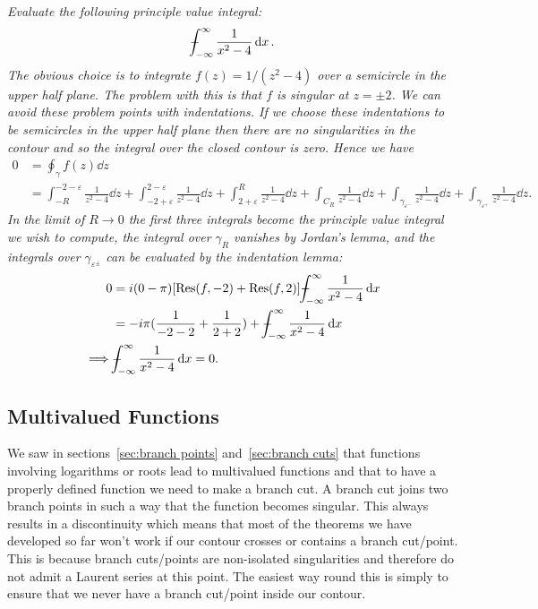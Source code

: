 \documentclass{article}
\newcommand{\pvint}{{-\mkern-19mu}\int}
\begin{document}
    \begin{example}
        \itshape
        Evaluate the following principle value integral:
        \[\pvint_{-\infty}^{\infty} \frac{1}{x^2 - 4}\dd{x}.\]
        \normalfont
        The obvious choice is to integrate \(f(z) = 1/(z^2 - 4)\) over a semicircle in the upper half plane.
        The problem with this is that \(f\) is singular at \(z = \pm 2\).
        We can avoid these problem points with indentations.
        If we choose these indentations to be semicircles in the upper half plane then there are no singularities in the contour and so the integral over the closed contour is zero.
        Hence we have
        \begin{align*}
            0 &= \oint_{\gamma} f(z) \dd{z}\\
            &= \int_{-R}^{-2-\varepsilon} \frac{1}{z^2 - 4}\dd{z} + \int_{-2+\varepsilon}^{2-\varepsilon} \frac{1}{z^2 - 4} \dd{z} + \int_{2 + \varepsilon}^{R} \frac{1}{z^2 - 4} \dd{z} + \int_{C_R} \frac{1}{z^2 - 4}\dd{z} + \int_{\gamma_{\varepsilon^-}} \frac{1}{z^2 - 4}\dd{z} + \int_{\gamma_{\varepsilon^+}} \frac{1}{z^2 - 4}\dd{z}.
        \end{align*}
        In the limit of \(R \to 0\) the first three integrals become the principle value integral we wish to compute, the integral over \(\gamma_R\) vanishes by Jordan's lemma, and the integrals over \(\gamma_{\varepsilon^{\pm}}\) can be evaluated by the indentation lemma:
        \begin{align*}
            0 &= i(0 - \pi)[\Res(f, -2) + \Res(f, 2)] \pvint_{-\infty}^{\infty} \frac{1}{x^2 - 4}\dd{x}\\
            &= -i\pi(\frac{1}{-2-2} + \frac{1}{2+2}) + \pvint_{-\infty}^{\infty} \frac{1}{x^2 - 4} \dd{x}\\
             \implies &\pvint_{-\infty}^{\infty} \frac{1}{x^2 - 4} \dd{x} = 0.
        \end{align*}
    \end{example}
    
    \subsection{Multivalued Functions}
    We saw in sections~\ref{sec:branch points} and~\ref{sec:branch cuts} that functions involving logarithms or roots lead to multivalued functions and that to have a properly defined function we need to make a branch cut.
    A branch cut joins two branch points in such a way that the function becomes singular.
    This always results in a discontinuity which means that most of the theorems we have developed so far won't work if our contour crosses or contains a branch cut/point.
    This is because branch cuts/points are non-isolated singularities and therefore do not admit a Laurent series at this point.
    The easiest way round this is simply to ensure that we never have a branch cut/point inside our contour.
    
\end{document}
